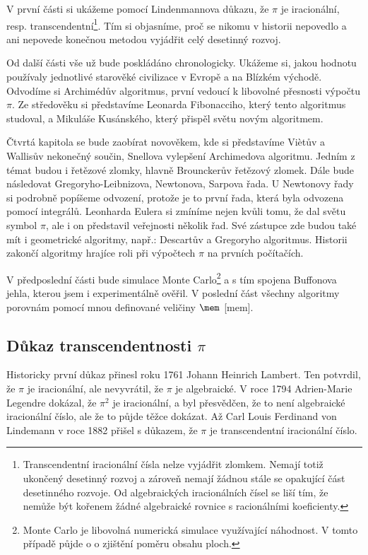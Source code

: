 \documentclass[rocnikovka]{gzwroc} %
\begin{document}
V první části si ukážeme pomocí Lindenmannova důkazu, že $\pi$ je iracionální, resp. transcendentní\footnote[2]{Transcendentní iracionální čísla nelze vyjádřit zlomkem. Nemají totiž ukončený desetinný rozvoj a zároveň nemají žádnou stále se opakující část desetinného rozvoje. Od algebraických  iracionálních čísel se liší tím, že nemůže být kořenem žádné algebraické rovnice s racionálními koeficienty.}. Tím si objasníme, proč se nikomu v historii nepovedlo a ani nepovede konečnou metodou vyjádřit celý desetinný rozvoj.

Od další části vše už bude poskládáno chronologicky. Ukážeme si, jakou hodnotu používaly jednotlivé starověké civilizace v Evropě a na Blízkém východě. Odvodíme si Archimédův algoritmus, první vedoucí k libovolné přesnosti výpočtu $\pi$.
Ze středověku si představíme Leonarda Fibonacciho, který tento algoritmus studoval, a Mikuláše Kusánského, který přispěl světu novým algoritmem.

Čtvrtá kapitola se bude zaobírat novověkem, kde si představíme Viètův a Wallisův nekonečný součin, Snellova vylepšení Archimedova algoritmu. Jedním z témat budou i řetězové zlomky, hlavně Brounckerův řetězový zlomek. Dále bude následovat Gregoryho-Leibnizova, Newtonova, Sarpova řada. U Newtonovy řady si podrobně popíšeme odvození, protože je to první řada, která byla odvozena pomocí integrálů. Leonharda Eulera si zmíníme nejen kvůli tomu, že dal světu symbol $\pi$, ale i on představil veřejnosti několik řad. Své zástupce zde budou také mít i geometrické algoritmy, např.: Descartův a Gregoryho algoritmus. Historii zakončí algoritmy hrajíce roli při výpočtech $\pi$ na prvních počítačích.

V předposlední části bude simulace Monte Carlo\footnote[3]{Monte Carlo je libovolná numerická simulace využívající náhodnost. V tomto případě půjde o o zjištění poměru obsahu ploch.} a s tím spojena Buffonova jehla, kterou jsem i experimentálně ověřil. V poslední část všechny algoritmy porovnám pomocí mnou definované veličiny $\mem$ [mem].
\subsection{Důkaz transcendentnosti $\pi$}
Historicky první důkaz přinesl roku 1761 Johann Heinrich Lambert. Ten potvrdil, že $\pi$ je iracionální, ale nevyvrátil, že $\pi$ je algebraické. V roce 1794 Adrien-Marie Legendre dokázal, že $\pi^2$ je iracionální, a byl přesvědčen, že to není algebraické iracionální číslo, ale že to půjde těžce dokázat. Až Carl Louis Ferdinand von Lindemann v roce 1882 přišel s důkazem, že $\pi$ je transcendentní iracionální číslo.
\end{document}
